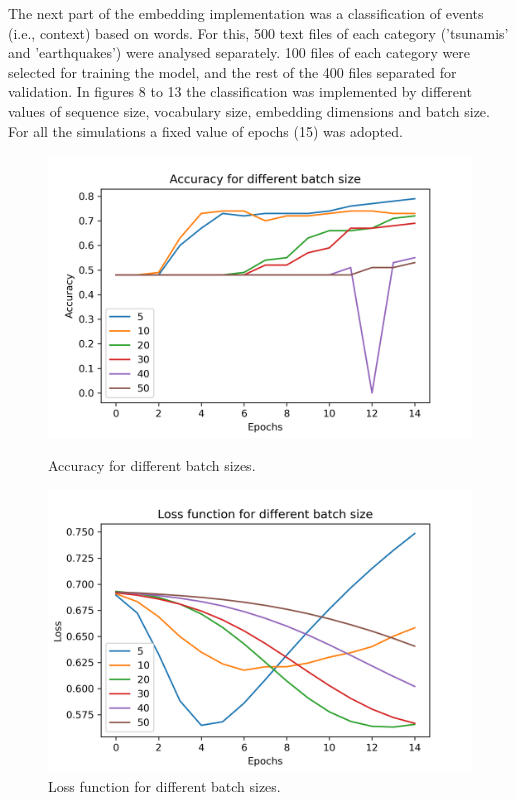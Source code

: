 \documentclass{article}
\begin{document}
The next part of the embedding implementation was a classification of events (i.e., context) based on words. For this, 500  text files of each category ('tsunamis' and 'earthquakes') were analysed separately. 100 files of each category were selected for training the model, and the rest of the 400 files separated for validation. In figures 8 to 13 the classification was implemented by different values of sequence size, vocabulary size, embedding dimensions and batch size. For all the simulations a fixed value of epochs (15) was adopted. 

\begin{figure}[h!]
  \centering
  \begin{minipage}[b]{0.45\textwidth}
    \includegraphics[width=\textwidth]{images/batch_test_acc.png}
    \caption{Accuracy for different batch sizes.}
  \end{minipage}
  \hfill
  \begin{minipage}[b]{0.45\textwidth}
    \includegraphics[width=\textwidth]{images/batch_test_loss.png}
    \caption{Loss function for different batch sizes.}
  \end{minipage}
  \label{fig:batch}
\end{figure}
\end{document}
